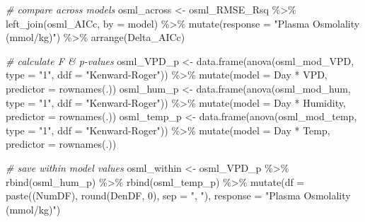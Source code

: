 \documentclass[
]{article}
\newenvironment{Shaded}{\begin{snugshade}}{\end{snugshade}}
\newcommand{\AttributeTok}[1]{\textcolor[rgb]{0.77,0.63,0.00}{#1}}
\newcommand{\CommentTok}[1]{\textcolor[rgb]{0.56,0.35,0.01}{\textit{#1}}}
\newcommand{\DecValTok}[1]{\textcolor[rgb]{0.00,0.00,0.81}{#1}}
\newcommand{\FunctionTok}[1]{\textcolor[rgb]{0.00,0.00,0.00}{#1}}
\newcommand{\NormalTok}[1]{#1}
\newcommand{\OtherTok}[1]{\textcolor[rgb]{0.56,0.35,0.01}{#1}}
\newcommand{\SpecialCharTok}[1]{\textcolor[rgb]{0.00,0.00,0.00}{#1}}
\newcommand{\StringTok}[1]{\textcolor[rgb]{0.31,0.60,0.02}{#1}}
\begin{document}
\begin{Shaded}
\begin{Highlighting}[]
\CommentTok{\# compare across models}
\NormalTok{osml\_across }\OtherTok{\textless{}{-}}\NormalTok{ osml\_RMSE\_Rsq }\SpecialCharTok{\%\textgreater{}\%}
  \FunctionTok{left\_join}\NormalTok{(osml\_AICc, }\AttributeTok{by =} \StringTok{\textquotesingle{}model\textquotesingle{}}\NormalTok{) }\SpecialCharTok{\%\textgreater{}\%}
  \FunctionTok{mutate}\NormalTok{(}\AttributeTok{response =} \StringTok{"Plasma Osmolality (mmol/kg)"}\NormalTok{) }\SpecialCharTok{\%\textgreater{}\%}
  \FunctionTok{arrange}\NormalTok{(Delta\_AICc)}

\CommentTok{\# calculate F \& p{-}values}
\NormalTok{osml\_VPD\_p }\OtherTok{\textless{}{-}} \FunctionTok{data.frame}\NormalTok{(}\FunctionTok{anova}\NormalTok{(osml\_mod\_VPD, }
                              \AttributeTok{type =} \StringTok{"1"}\NormalTok{, }
                              \AttributeTok{ddf =} \StringTok{"Kenward{-}Roger"}\NormalTok{)) }\SpecialCharTok{\%\textgreater{}\%}
  \FunctionTok{mutate}\NormalTok{(}\AttributeTok{model =} \StringTok{\textquotesingle{}Day * VPD\textquotesingle{}}\NormalTok{,}
         \AttributeTok{predictor =} \FunctionTok{rownames}\NormalTok{(.))}
\NormalTok{osml\_hum\_p }\OtherTok{\textless{}{-}} \FunctionTok{data.frame}\NormalTok{(}\FunctionTok{anova}\NormalTok{(osml\_mod\_hum, }
                              \AttributeTok{type =} \StringTok{"1"}\NormalTok{, }
                              \AttributeTok{ddf =} \StringTok{"Kenward{-}Roger"}\NormalTok{)) }\SpecialCharTok{\%\textgreater{}\%}
  \FunctionTok{mutate}\NormalTok{(}\AttributeTok{model =} \StringTok{\textquotesingle{}Day * Humidity\textquotesingle{}}\NormalTok{,}
         \AttributeTok{predictor =} \FunctionTok{rownames}\NormalTok{(.))}
\NormalTok{osml\_temp\_p }\OtherTok{\textless{}{-}} \FunctionTok{data.frame}\NormalTok{(}\FunctionTok{anova}\NormalTok{(osml\_mod\_temp, }
                              \AttributeTok{type =} \StringTok{"1"}\NormalTok{, }
                              \AttributeTok{ddf =} \StringTok{"Kenward{-}Roger"}\NormalTok{)) }\SpecialCharTok{\%\textgreater{}\%}
  \FunctionTok{mutate}\NormalTok{(}\AttributeTok{model =} \StringTok{\textquotesingle{}Day * Temp\textquotesingle{}}\NormalTok{,}
         \AttributeTok{predictor =} \FunctionTok{rownames}\NormalTok{(.))}

\CommentTok{\# save within model values}
\NormalTok{osml\_within }\OtherTok{\textless{}{-}}\NormalTok{ osml\_VPD\_p }\SpecialCharTok{\%\textgreater{}\%}
  \FunctionTok{rbind}\NormalTok{(osml\_hum\_p) }\SpecialCharTok{\%\textgreater{}\%}
  \FunctionTok{rbind}\NormalTok{(osml\_temp\_p) }\SpecialCharTok{\%\textgreater{}\%}
  \FunctionTok{mutate}\NormalTok{(}\AttributeTok{df =} \FunctionTok{paste}\NormalTok{((NumDF), }\FunctionTok{round}\NormalTok{(DenDF, }\DecValTok{0}\NormalTok{), }\AttributeTok{sep =} \StringTok{", "}\NormalTok{),}
         \AttributeTok{response =} \StringTok{"Plasma Osmolality (mmol/kg)"}\NormalTok{)}
\end{Highlighting}
\end{Shaded}
\end{document}
